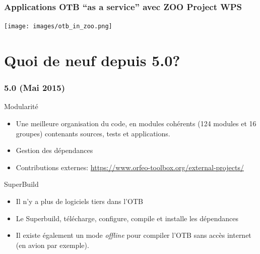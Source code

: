 \documentclass[8pt]{beamer}
\begin{document}
\begin{frame}
  \frametitle{Applications OTB ``as a service'' avec ZOO Project WPS}
\begin{minipage}[t][6cm][t]{\textwidth}
\begin{center}
\texttt{[image: images/otb\_in\_zoo.png]}
\end{center}
\end{minipage}
\end{frame}

\section{Quoi de neuf depuis 5.0?}

\begin{frame}
\frametitle{5.0 (Mai 2015)}
\begin{block}{Modularité}
\begin{itemize}
\item Une meilleure organisation du code, en modules cohérents (124 modules et
    16 groupes) contenants sources, tests et applications.
\item Gestion des dépendances
\item Contributions externes: \url{https://www.orfeo-toolbox.org/external-projects/}
\end{itemize}
\end{block}

\begin{block}{SuperBuild}
\begin{itemize}
\item Il n'y a plus de logiciels tiers dans l'OTB
\item Le Superbuild, télécharge, configure, compile et installe les dépendances
\item Il existe également un mode \textit{offline} pour compiler l'OTB sans
  accès internet (en avion par exemple).
\end{itemize}
\end{block}
\end{frame}
\end{document}
